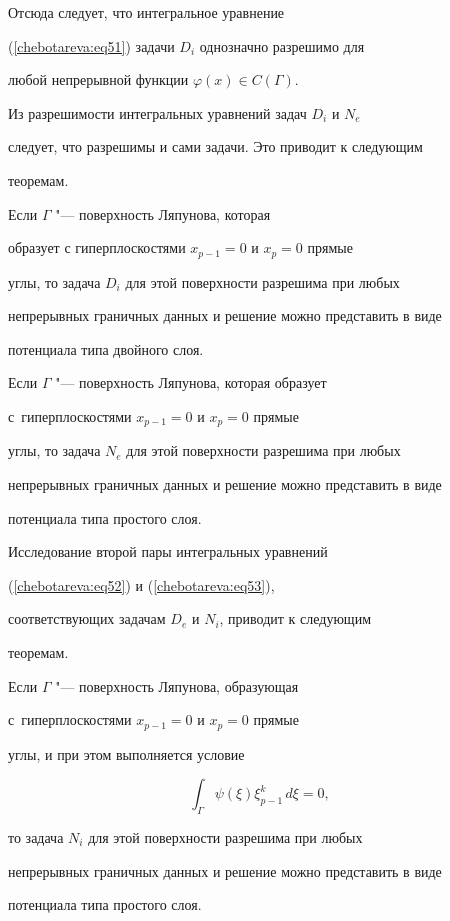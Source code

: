 Отсюда следует,  что интегральное уравнение


(\ref{chebotareva:eq51}) задачи $D_i $ однозначно разрешимо для


любой непрерывной функции $\varphi \left( x \right) \in C\left(


\Gamma \right)$.





Из разрешимости интегральных уравнений задач $D_i $ и $N_e $


следует,  что разрешимы и сами задачи. Это приводит к следующим


теоремам.





\begin{theorem}[8]Если $\Gamma$ "--- поверхность Ляпунова, которая


образует с гиперплоскостями $x_{p - 1} = 0$ и $x_p = 0$ прямые


углы,  то задача $D_i $ для этой поверхности разрешима при любых


непрерывных граничных данных и решение можно представить в виде


потенциала типа двойного слоя.


\end{theorem}


\begin{theorem}[9]Если $\Gamma $ "--- поверхность Ляпунова, которая образует 


с~гиперплоскостями $x_{p - 1} = 0$ и $x_p = 0$ прямые


углы,  то задача $N_e$ для этой поверхности разрешима при любых


непрерывных граничных данных и решение можно представить в виде


потенциала типа простого слоя.


\end{theorem}


Исследование второй пары интегральных уравнений


(\ref{chebotareva:eq52}) и (\ref{chebotareva:eq53}), 


соответствующих  задачам $D_e$ и $N_i$,  приводит к следующим


теоремам.


\begin{theorem}[10]Если $\Gamma $ "--- поверхность Ляпунова, образующая


с~гиперплоскостями $x_{p - 1} = 0$ и $x_p = 0$ прямые


углы,  и при этом выполняется условие


\[


\label{chebotareva:eq67} \int_\Gamma \psi \left( \xi


\right)\xi _{p - 1}^k \,d\xi  = 0,


\]


то задача $N_i $ для этой поверхности разрешима при любых


непрерывных граничных данных и решение можно представить в виде


потенциала типа простого слоя.


\end{theorem}


